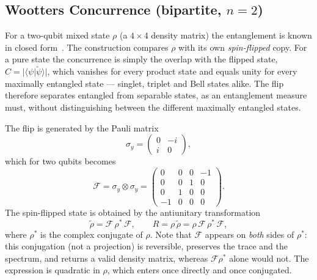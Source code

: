
\subsection{Wootters Concurrence (bipartite, $n=2$)}
For a two-qubit mixed state $\rho$ (a $4\times4$ density matrix) the
entanglement is known in closed form~\cite{Wootters1998}. The construction
compares $\rho$ with its own \emph{spin-flipped} copy. For a pure state the
concurrence is simply the overlap with the flipped state,
$C=\lvert\langle\psi|\tilde\psi\rangle\rvert$, which vanishes for every product
state and equals unity for every maximally entangled state --- singlet,
triplet and Bell states alike. The flip therefore separates entangled from
separable states, as an entanglement measure must, without distinguishing
between the different maximally entangled states.

The flip is generated by the Pauli matrix
%
\begin{equation}
    \sigma_y = \begin{pmatrix} 0 & -i \\ i & 0 \end{pmatrix},
\end{equation}
%
which for two qubits becomes
%
\begin{equation}
    \mathcal{F} = \sigma_y \otimes \sigma_y =
    \begin{pmatrix}
        0 & 0 & 0 & -1 \\
        0 & 0 & 1 & 0 \\
        0 & 1 & 0 & 0 \\
        -1 & 0 & 0 & 0
    \end{pmatrix}.
\end{equation}
%
The spin-flipped state is obtained by the antiunitary transformation
%
\begin{equation}
    \tilde{\rho} = \mathcal{F}\, \rho^{*}\, \mathcal{F},
    \qquad
    R = \rho\,\tilde{\rho}
      = \rho\,\mathcal{F}\,\rho^{*}\,\mathcal{F},
\end{equation}
%
where $\rho^{*}$ is the complex conjugate of $\rho$. Note that $\mathcal{F}$
appears on \emph{both} sides of $\rho^{*}$: this conjugation (not a
projection) is reversible, preserves the trace and the spectrum, and returns a
valid density matrix, whereas $\mathcal{F}\rho^{*}$ alone would not. The
expression is quadratic in $\rho$, which enters once directly and once
conjugated.

